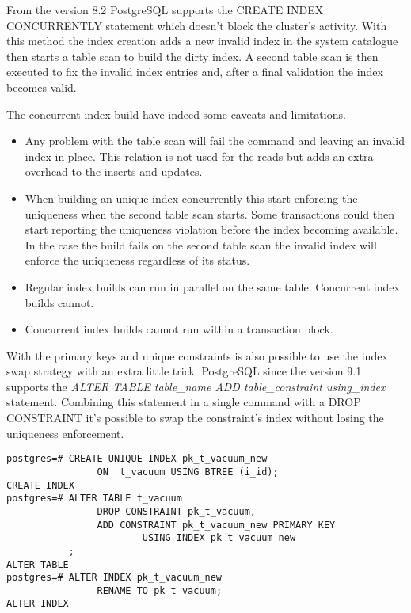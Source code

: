 From the version 8.2 PostgreSQL supports the CREATE INDEX CONCURRENTLY statement which doesn't block the cluster's activity. With this method  the index creation 
adds a new invalid index in the system catalogue then starts a table scan to build the dirty index. A 
second table scan is then executed to fix the invalid index entries and, after a final validation 
the index becomes valid. \newline

The concurrent index build have indeed some caveats and limitations.
\begin{itemize}
 \item Any problem with the table scan will fail the command and leaving an invalid index in place.
This relation is not used for the reads but adds an extra overhead to the inserts and updates.
\item When building an unique index concurrently this start enforcing the uniqueness when the 
second table scan starts. Some transactions could then start reporting the uniqueness violation 
before the index becoming available. In the case the build fails on the second table scan the invalid
index will enforce the uniqueness regardless of its status.
\item Regular index builds can run in parallel on the same table. Concurrent index builds cannot.
\item Concurrent index builds cannot run within a transaction block.
\end{itemize}

With the primary keys and unique constraints is also possible to use the index swap strategy with 
an extra little trick. PostgreSQL since the version 9.1 supports the \textit{ALTER TABLE table\_name 
ADD table\_constraint using\_index} statement. Combining this statement in a single command with a 
DROP CONSTRAINT it's possible to swap the constraint's index without losing the uniqueness 
enforcement.

\begin{lstlisting}[style=pgsql]
postgres=# CREATE UNIQUE INDEX pk_t_vacuum_new 
                ON  t_vacuum USING BTREE (i_id);
CREATE INDEX
postgres=# ALTER TABLE t_vacuum
                DROP CONSTRAINT pk_t_vacuum,
                ADD CONSTRAINT pk_t_vacuum_new PRIMARY KEY  
                        USING INDEX pk_t_vacuum_new
           ;
ALTER TABLE
postgres=# ALTER INDEX pk_t_vacuum_new 
                RENAME TO pk_t_vacuum;
ALTER INDEX

\end{lstlisting}

